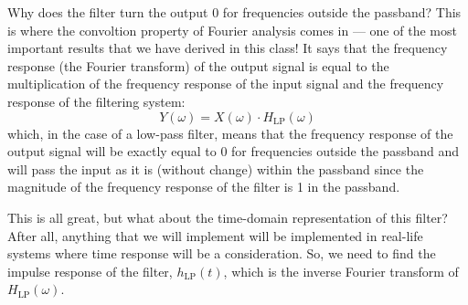 Why does the filter turn the output 0 for frequencies outside the passband? This is where the convoltion property of Fourier analysis comes in --- one of the most important results that we have derived in this class! It says that the frequency response (the Fourier transform) of the output signal is equal to the multiplication of the frequency response of the input signal and the frequency response of the filtering system:
\[
Y(\omega) = X(\omega) \cdot H_{\text{LP}}(\omega)
\]
which, in the case of a low-pass filter, means that the frequency response of the output signal will be exactly equal to 0 for frequencies outside the passband and will pass the input as it is (without change) within the passband since the magnitude of the frequency response of the filter is 1 in the passband.

This is all great, but what about the time-domain representation of this filter? After all, anything that we will implement will be implemented in real-life systems where time response will be a consideration. So, we need to find the impulse response of the filter, $h_{\text{LP}}(t)$, which is the inverse Fourier transform of $H_{\text{LP}}(\omega)$.

